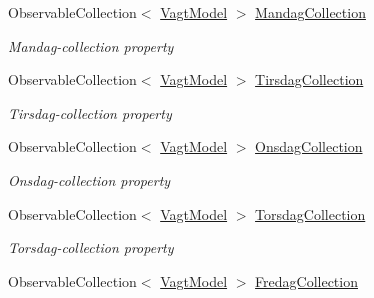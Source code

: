 \begin{DoxyCompactItemize}
\item 
Observable\+Collection$<$ \hyperlink{class__1aarsproeve_1_1_model_1_1_vagt_model}{Vagt\+Model} $>$ \hyperlink{class__1aarsproeve_1_1_model_1_1_vagtplan_singleton_a798188a332aa72ae776750249c10dfa8}{Mandag\+Collection}
\begin{DoxyCompactList}\small\item\em Mandag-\/collection property \end{DoxyCompactList}\item 
Observable\+Collection$<$ \hyperlink{class__1aarsproeve_1_1_model_1_1_vagt_model}{Vagt\+Model} $>$ \hyperlink{class__1aarsproeve_1_1_model_1_1_vagtplan_singleton_acc54a5368a75c1dc19f867f120f2dd62}{Tirsdag\+Collection}
\begin{DoxyCompactList}\small\item\em Tirsdag-\/collection property \end{DoxyCompactList}\item 
Observable\+Collection$<$ \hyperlink{class__1aarsproeve_1_1_model_1_1_vagt_model}{Vagt\+Model} $>$ \hyperlink{class__1aarsproeve_1_1_model_1_1_vagtplan_singleton_a8c239874839287ad27bba21fa84fb900}{Onsdag\+Collection}
\begin{DoxyCompactList}\small\item\em Onsdag-\/collection property \end{DoxyCompactList}\item 
Observable\+Collection$<$ \hyperlink{class__1aarsproeve_1_1_model_1_1_vagt_model}{Vagt\+Model} $>$ \hyperlink{class__1aarsproeve_1_1_model_1_1_vagtplan_singleton_a13ff802bb261b6972c3bddd4b5420125}{Torsdag\+Collection}
\begin{DoxyCompactList}\small\item\em Torsdag-\/collection property \end{DoxyCompactList}\item 
Observable\+Collection$<$ \hyperlink{class__1aarsproeve_1_1_model_1_1_vagt_model}{Vagt\+Model} $>$ \hyperlink{class__1aarsproeve_1_1_model_1_1_vagtplan_singleton_a8f4285898ec9478919b58cb470360aef}{Fredag\+Collection}

\end{DoxyCompactItemize}
